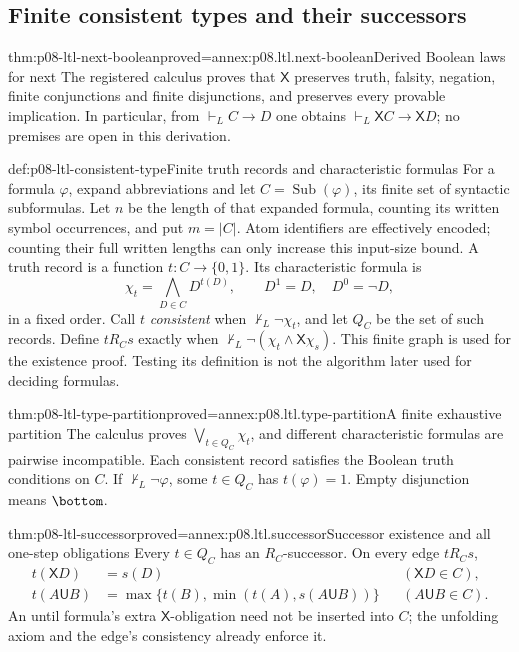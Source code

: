 \subsection{Finite consistent types and their successors}
\label{sec:p08-ltl-consistent-types}

\begin{hblemma}{thm:p08-ltl-next-boolean}{proved=annex:p08.ltl.next-boolean}{Derived Boolean laws for next}
The registered calculus proves that \(\mathsf X\) preserves truth,
falsity, negation, finite conjunctions and finite disjunctions, and
preserves every provable implication. In particular, from
\(\vdash_L C\to D\) one obtains
\(\vdash_L\mathsf XC\to\mathsf XD\); no premises are open
in this derivation.
\end{hblemma}

\begin{hbdefinition}{def:p08-ltl-consistent-type}{Finite truth records and characteristic formulas}
For a formula \(\varphi\), expand abbreviations and let
\(C=\operatorname{Sub}(\varphi)\), its finite set of syntactic
subformulas. Let \(n\) be the length of that expanded formula,
counting its written symbol occurrences, and put \(m=|C|\).
Atom identifiers are effectively encoded; counting their full
written lengths can only increase this input-size bound.
A truth record is a function
\(t:C\to\{0,1\}\). Its characteristic formula is
\[
 \chi_t=\bigwedge_{D\in C}D^{t(D)},\qquad
 D^1=D,\quad D^0=\neg D,
\]
in a fixed order. Call \(t\) \emph{consistent} when
\(\nvdash_L\neg\chi_t\), and let \(Q_C\) be the set of such
records. Define \(tR_Cs\) exactly when
\(\nvdash_L\neg(\chi_t\land\mathsf X\chi_s)\).
This finite graph is used for the existence proof. Testing its
definition is not the algorithm later used for deciding formulas.
\end{hbdefinition}

\begin{hblemma}{thm:p08-ltl-type-partition}{proved=annex:p08.ltl.type-partition}{A finite exhaustive partition}
The calculus proves \(\bigvee_{t\in Q_C}\chi_t\), and different
characteristic formulas are pairwise incompatible. Each consistent
record satisfies the Boolean truth conditions on \(C\). If
\(\nvdash_L\neg\varphi\), some \(t\in Q_C\) has
\(t(\varphi)=1\). Empty disjunction means \(\bottom\).
\end{hblemma}

\begin{hblemma}{thm:p08-ltl-successor}{proved=annex:p08.ltl.successor}{Successor existence and all one-step obligations}
Every \(t\in Q_C\) has an \(R_C\)-successor. On every edge
\(tR_Cs\),
\[
\begin{aligned}
 t(\mathsf XD)&=s(D)&& (\mathsf XD\in C),\\
 t(A\mathbin{\mathsf U}B)&=
 \max\{t(B),\min(t(A),s(A\mathbin{\mathsf U}B))\}
 &&(A\mathbin{\mathsf U}B\in C).
\end{aligned}
\]
An until formula's extra \(\mathsf X\)-obligation need not be
inserted into \(C\); the unfolding axiom and the edge's consistency
already enforce it.
\end{hblemma}

